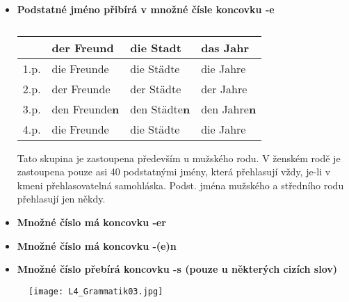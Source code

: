 \begin{itemize}
\begin{itemize}
            \item \textbf{Podstatné jméno přibírá v množné čísle koncovku -e}\newline
              \begin{table}[ht!]   %
                \hspace*{4em}
                \begin{tabular}{l|lll}
                       & \textbf{der Freund}   & \textbf{die Stadt}   & \textbf{das Jahr}    \\
                  \hline
                  1.p. & die Freunde           & die Städte           & die Jahre            \\
                  2.p. & der Freunde           & der Städte           & der Jahre            \\
                  3.p. & den Freunde\textbf{n} & den Städte\textbf{n} & den Jahre\textbf{n}  \\
                  4.p. & die Freunde           & die Städte           & die Jahre            \\
                  \hline
                \end{tabular}
                \caption*{ }
              \end{table}

              Tato skupina je zastoupena především u mužského rodu. V ženském rodě je zastoupena 
              pouze asi 40 podstatnými jmény, která přehlasují vždy, je-li v kmeni přehlasovatelná 
              samohláska. Podst. jména mužského a středního rodu přehlasují jen někdy.
              
            \item \textbf{Množné číslo má koncovku -er}\newline
            \item \textbf{Množné číslo má koncovku -(e)n}\newline
            \item \textbf{Množné číslo přebírá koncovku -s (pouze u některých cizích slov)}\newline
         \end{itemize}
      \end{itemize}
    
    \begin{figure}[ht!]
      \centering
      \texttt{[image: L4\_Grammatik03.jpg]}
      \caption*{ }
      \label{NJ:fig_L4_Grammatik03}
    \end{figure}
    
